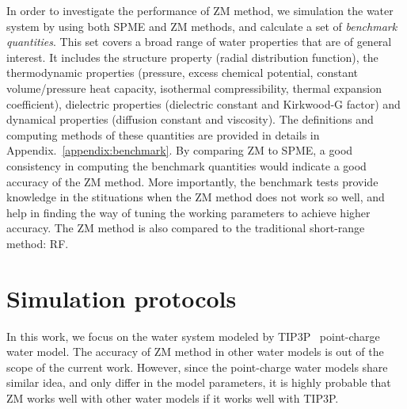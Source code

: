 \documentclass[aip,jcp,a4paper,preprint,unsortedaddress,onecolumn,fleqn]{revtex4-1}
\begin{document}
In order to investigate the performance of ZM method, we simulation
the water system by using both SPME and ZM methods, and calculate a set
of \emph{benchmark quantities}.  This set covers a broad range of
water properties that are of general interest. It includes the
structure property (radial distribution function), the thermodynamic
properties (pressure, excess chemical potential, constant
volume/pressure heat capacity, isothermal compressibility, thermal
expansion coefficient), dielectric properties (dielectric constant and
Kirkwood-G factor) and dynamical properties (diffusion constant and
viscosity).
The definitions and computing methods of these quantities are provided in details
in Appendix.~\ref{appendix:benchmark}.
By comparing ZM to SPME, a good consistency in computing
the benchmark quantities would indicate a good accuracy of the ZM
method.
More importantly, the benchmark tests provide knowledge in the
stituations when the ZM method does not work so well, and help in
finding the way of tuning the working parameters to achieve higher accuracy.
The ZM method is also compared to the traditional short-range method: RF.


\section{Simulation protocols}

In this work, we focus on the water system modeled by
TIP3P~\cite{jorgensen1983comparison} point-charge water model.
The accuracy of ZM method in other water models is out of the scope of the current work.
However, since the point-charge water models share similar idea, and  only differ
in the model parameters, it is highly probable that ZM works well with other water models if it works
well with TIP3P.
\end{document}
